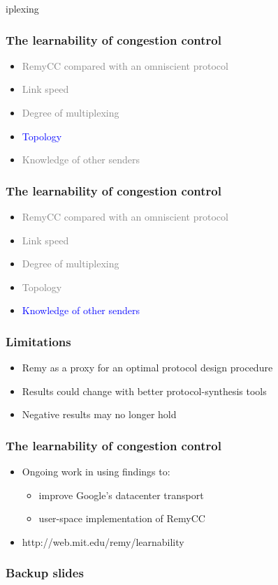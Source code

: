 \documentclass[svgnames]{beamer}
\begin{document}
\begin{Large}
iplexing

\begin{frame}
\frametitle{The learnability of congestion control}
\begin{itemize}
\item \textcolor{gray}{RemyCC compared with an omniscient protocol}
\item \textcolor{gray}{Link speed}
\item \textcolor{gray}{Degree of multiplexing}
\item \textcolor{blue}{Topology}
\item \textcolor{gray}{Knowledge of other senders}
\end{itemize}
\end{frame}

 

\begin{frame}
\frametitle{The learnability of congestion control}
\begin{itemize}
\item \textcolor{gray}{RemyCC compared with an omniscient protocol}
\item \textcolor{gray}{Link speed}
\item \textcolor{gray}{Degree of multiplexing}
\item \textcolor{gray}{Topology}
\item \textcolor{blue}{Knowledge of other senders}
\end{itemize}
\end{frame}



\begin{frame}
\frametitle{Limitations}
\begin{itemize}
\item<2-> Remy as a proxy for an optimal protocol design procedure
\item<3-> Results could change with better protocol-synthesis tools
\item<4-> Negative results may no longer hold
\end{itemize}
\end{frame}

\begin{frame}
\frametitle{The learnability of congestion control}
\noindent
\begin{itemize}
\item<1-> Ongoing work in using findings to:
\begin{itemize}
\item<2-> improve Google's datacenter transport
\item<3-> user-space implementation of RemyCC
\end{itemize}
\item<4-> http://web.mit.edu/remy/learnability
\end{itemize}
\end{frame}

\end{Large}

\begin{frame}
\frametitle{Backup slides}
\end{frame}







\end{document}
